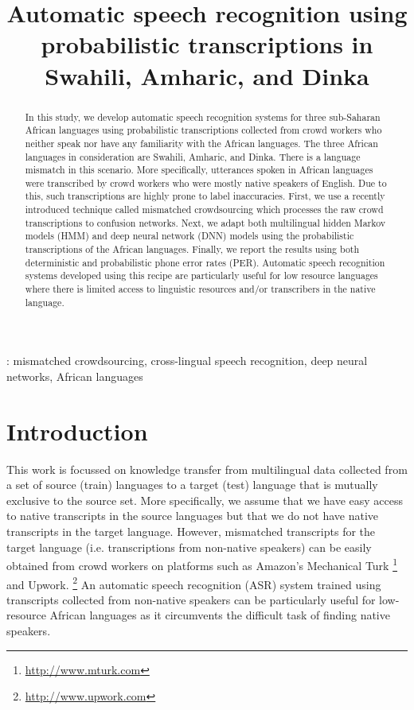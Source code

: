 \documentclass[a4paper]{article}
\title{Automatic speech recognition using probabilistic transcriptions in Swahili, Amharic, and Dinka}
\newcommand{\myvspacesec}{\vspace{-2mm}}
\begin{document}
\maketitle
\begin{abstract}
In this study, we develop automatic speech recognition systems for three sub-Saharan African languages
using probabilistic transcriptions collected from crowd workers who neither speak nor have any familiarity
with the African languages. The three African languages in consideration are Swahili, Amharic, and Dinka. There is a language mismatch in this scenario. More specifically, utterances spoken in African languages were transcribed by crowd workers who were mostly native speakers of English. Due to this, such transcriptions are highly prone to label inaccuracies. First, we use a recently introduced technique called mismatched crowdsourcing which processes the raw crowd transcriptions to confusion networks. Next, we  adapt both multilingual hidden Markov models (HMM) and deep neural network (DNN) models using the probabilistic transcriptions of the African languages.  Finally, we report the results using both deterministic and probabilistic phone error rates (PER). Automatic speech recognition systems developed using this recipe are particularly useful for low resource languages where there is limited access to linguistic resources and/or transcribers in the native language.
\end{abstract}
%
: mismatched crowdsourcing, cross-lingual speech recognition, deep neural networks,
African languages
\vspace{-3mm}
%
\myvspacesec
\section{Introduction}  \vspace{-2mm}
\label{sec:Introduction}
This work is focussed on knowledge transfer from multilingual data collected from a set of source (train) languages to a target (test) language that is mutually exclusive to the source set. More specifically, we assume that we have easy access to native transcripts in the source languages but that we do not have native transcripts in the target language. However, mismatched transcripts for the target language (i.e. transcriptions from non-native speakers) can be easily obtained from crowd workers on platforms such as Amazon's Mechanical Turk%
\footnote{\url{http://www.mturk.com}}
%
and Upwork.%
\footnote{\url{http://www.upwork.com}}
%
An automatic speech recognition (ASR) system trained using transcripts collected from non-native speakers can be particularly useful for low-resource African languages as it circumvents the difficult task of finding native speakers.
\end{document}
